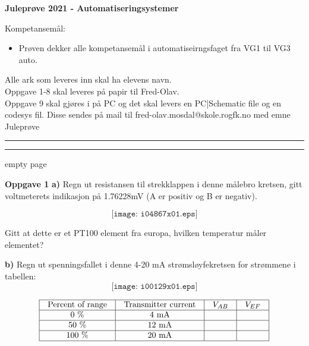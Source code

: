 
\centerline{\bf Juleprøve 2021 - Automatiseringsystemer}  \bigskip

Kompetansemål:
\begin{itemize}[noitemsep]

	\item Prøven dekker alle kompetansemål i automatiseirngsfaget fra VG1 til VG3 auto.  
\end{itemize}

Alle ark som leveres inn skal ha elevens navn. \\ 

Oppgave 1-8 skal leveres på papir til Fred-Olav. \\
Oppgave 9 skal gjøres i  på PC og det skal levers en PC|Schematic file og en codesys fil. Disse sendes på mail til fred-olav.mosdal@skole.rogfk.no med emne Juleprøve

\bigskip 
\hrule
\bigskip 
\hrule
\vfil \eject
empty page

\vfil \eject
\textbf{Oppgave 1}
\textbf{a)} Regn ut resistansen til strekklappen i denne målebro kretsen, gitt voltmeterets indikasjon på 1.76228mV (A er positiv og B er negativ).

$$\texttt{[image: i04867x01.eps]}$$

Gitt at dette er et PT100 element fra europa, hvilken temperatur måler elementet?

\vskip 1cm 


\vfil \eject
\textbf{b)} Regn ut spenningsfallet i denne 4-20 mA strømsløyfekretsen for strømmene i tabellen:
$$\texttt{[image: i00129x01.eps]}$$


$$\vbox{\offinterlineskip
\halign{\strut
\vrule \quad\hfil # \ \hfil & 
\vrule \quad\hfil # \ \hfil & 
\vrule \quad\hfil # \ \hfil & 
\vrule \quad\hfil # \ \hfil \vrule \cr
\noalign{\hrule}
%
Percent of range & Transmitter current & $V_{AB}$ &  $V_{EF}$ \cr
%
\noalign{\hrule}
%
0 \% & 4 mA &  &  \cr
%
\noalign{\hrule}
%
%
%
50 \% & 12 mA &  &  \cr
%
\noalign{\hrule}
%
%
%
100 \% & 20 mA &  &  \cr
%
\noalign{\hrule}
} %
}$$ %

